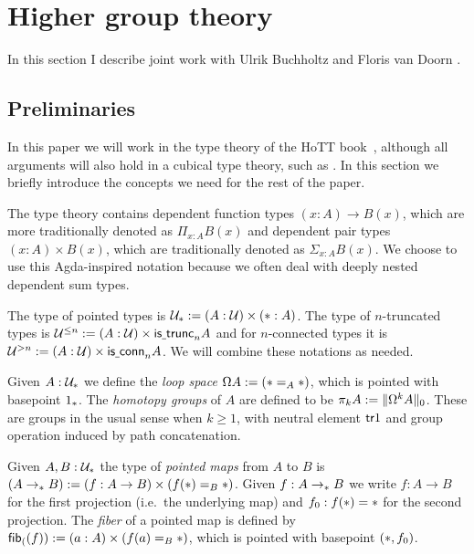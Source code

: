\chapter{Higher group theory}\label{chap:higher_groups}
In this section I describe joint work with Ulrik Buchholtz and Floris van Doorn \cite{BuchholtzDoornRijke}.

\section{Preliminaries}
\label{sec:preliminaries}

In this paper we will work in the type theory of the HoTT book~\cite{hottbook}, although all arguments will also hold in a cubical type theory, such as \cite{CCHM2016,chtt}. In this section we briefly introduce the concepts we need for the rest of the paper.

The type theory contains dependent function types $(x : A) \to B(x)$, which are more traditionally denoted as $\Pi_{x : A}B(x)$ and dependent pair types $(x : A) \times B(x)$, which are traditionally denoted as $\Sigma_{x : A}B(x)$. We choose to use this Agda-inspired notation because we often deal with deeply nested dependent sum types.

The type of pointed types is
$\UU_\pt := (A : \UU) \times (\pt : A)$. The type of $n$-truncated types is
$\UU^{\le n} := (A : \UU) \times \istrunc{n}{A}$ and for $n$-connected types it is
$\UU^{>n} := (A : \UU) \times \mathsf{is\usc{}conn}_n A$. We will combine these notations as needed.

Given $A:\UU_\pt$ we define the \emph{loop space} $\Omega
A:=(\pt=_A\pt)$, which is pointed with basepoint $1_\pt$. The
\emph{homotopy groups} of $A$ are defined to be $\pi_k A:=
\trunc{0}{\Omega^k A}$. These are groups in the usual sense when
$k\ge1$, with neutral element $\tr{1}$ and group
operation induced by path concatenation.

Given $A,B:\UU_\pt$ the type of \emph{pointed maps} from $A$ to $B$
is $(A\to_\pt B):=(f : A \to B)\times (f(\pt)=_B\pt)$. Given $f:A\to_\pt
B$ we write $f:A\to B$ for the first projection (i.e.~the underlying map) and $f_0:f(\pt)=\pt$ for
the second projection. The \emph{fiber} of a pointed map is defined by
$\fib(f):=(a:A)\times (f(a)=_B\pt)$, which is pointed with basepoint $(\pt,f_0)$.


